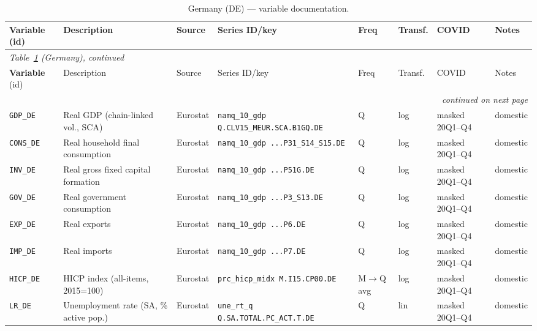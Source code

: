 \begin{longtable}{@{}p{}p{}p{}p{}p{}p{}p{}p{}@{}}
\caption{Germany (DE) --- variable documentation.}\label{tab:data:DE}\\
\toprule
\textbf{Variable} (id) & Description & Source & Series ID/key & Freq & Transf. & COVID & Notes \\
\midrule
\endfirsthead
\multicolumn{8}{l}{\small\itshape Table~\ref{tab:data:DE} (Germany), continued}\\
\toprule
\textbf{Variable} (id) & Description & Source & Series ID/key & Freq & Transf. & COVID & Notes \\
\midrule
\endhead
\midrule \multicolumn{8}{r}{\small\itshape continued on next page}\\
\endfoot
\bottomrule
\endlastfoot
\texttt{GDP\_DE}    & Real GDP (chain-linked vol., SCA) & Eurostat & \texttt{namq\_10\_gdp Q.\allowbreak CLV15\_MEUR.\allowbreak SCA.\allowbreak B1GQ.\allowbreak DE} & Q & log & masked 20Q1--Q4 & domestic \\
\texttt{CONS\_DE}   & Real household final consumption & Eurostat & \texttt{namq\_10\_gdp ...\allowbreak P31\_S14\_S15.\allowbreak DE} & Q & log & masked 20Q1--Q4 & domestic \\
\texttt{INV\_DE}    & Real gross fixed capital formation & Eurostat & \texttt{namq\_10\_gdp ...\allowbreak P51G.\allowbreak DE} & Q & log & masked 20Q1--Q4 & domestic \\
\texttt{GOV\_DE}    & Real government consumption & Eurostat & \texttt{namq\_10\_gdp ...\allowbreak P3\_S13.\allowbreak DE} & Q & log & masked 20Q1--Q4 & domestic \\
\texttt{EXP\_DE}    & Real exports & Eurostat & \texttt{namq\_10\_gdp ...\allowbreak P6.\allowbreak DE} & Q & log & masked 20Q1--Q4 & domestic \\
\texttt{IMP\_DE}    & Real imports & Eurostat & \texttt{namq\_10\_gdp ...\allowbreak P7.\allowbreak DE} & Q & log & masked 20Q1--Q4 & domestic \\
\texttt{HICP\_DE}   & HICP index (all-items, 2015=100) & Eurostat & \texttt{prc\_hicp\_midx M.\allowbreak I15.\allowbreak CP00.\allowbreak DE} & M$\to$Q avg & log & masked 20Q1--Q4 & domestic \\
\texttt{LR\_DE}     & Unemployment rate (SA, \% active pop.) & Eurostat & \texttt{une\_rt\_q Q.\allowbreak SA.\allowbreak TOTAL.\allowbreak PC\_ACT.\allowbreak T.\allowbreak DE} & Q & lin & masked 20Q1--Q4 & domestic \\

\end{longtable}
